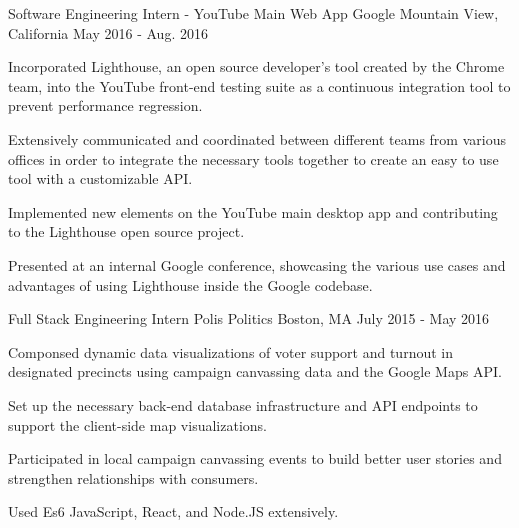 


\begin{cventries}


\cventry
{Software Engineering Intern - YouTube Main Web App} %
{Google} %
{Mountain View, California} %
{May 2016 - Aug. 2016} %
{ %
\begin{cvitems}
\item {Incorporated Lighthouse, an open
source developer's tool created by the Chrome team, into the YouTube front-end
testing suite as a continuous integration tool to prevent performance
regression.}
\item {Extensively communicated and coordinated between
different teams from various offices in order to integrate the necessary tools
together to create an easy to use tool with a customizable API.}
\item {Implemented new elements on the YouTube main desktop app
and contributing to the Lighthouse open source project.}
\item {Presented at an internal Google conference, showcasing the various use
cases and advantages of using Lighthouse inside the Google codebase.}
\end{cvitems}
}


\cventry
{Full Stack Engineering Intern} %
{Polis Politics} %
{Boston, MA} %
{July 2015 - May 2016} %
{ %
\begin{cvitems}
\item{Componsed dynamic data visualizations of voter support and turnout in
designated precincts using campaign canvassing data and the Google Maps API.}
\item {Set up the necessary back-end database infrastructure and API endpoints
to support the client-side map visualizations.}
\item {Participated in local campaign canvassing events to build better user
stories and strengthen relationships with consumers.}
\item {Used Es6 JavaScript, React, and Node.JS extensively.}
\end{cvitems}
}


\end{cventries}
